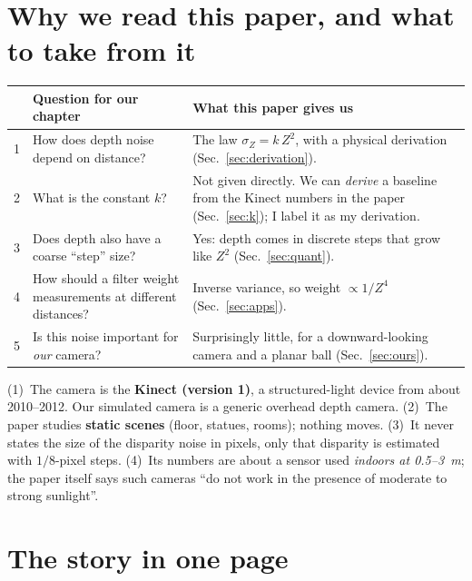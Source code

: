 \documentclass[11pt,a4paper]{article}
\begin{document}
\tableofcontents
\newpage

\section{Why we read this paper, and what to take from it}

\begin{center}
\begin{tabularx}{\textwidth}{@{}c p{4.6cm} X@{}}
\toprule
 & Question for our chapter & What this paper gives us \\
\midrule
1 & How does depth noise depend on distance? & The law $\sigma_Z = k\,Z^2$, with a physical derivation (Sec.~\ref{sec:derivation}). \\
2 & What is the constant $k$? & Not given directly. We can \emph{derive} a baseline from the Kinect numbers in the paper (Sec.~\ref{sec:k}); I label it as my derivation. \\
3 & Does depth also have a coarse ``step'' size? & Yes: depth comes in discrete steps that grow like $Z^2$ (Sec.~\ref{sec:quant}). \\
4 & How should a filter weight measurements at different distances? & Inverse variance, so weight $\propto 1/Z^4$ (Sec.~\ref{sec:apps}). \\
5 & Is this noise important for \emph{our} camera? & Surprisingly little, for a downward-looking camera and a planar ball (Sec.~\ref{sec:ours}). \\
\bottomrule
\end{tabularx}
\end{center}

\begin{warn}
(1)~The camera is the \textbf{Kinect (version 1)}, a structured-light device from about 2010--2012.
Our simulated camera is a generic overhead depth camera. (2)~The paper studies \textbf{static
scenes} (floor, statues, rooms); nothing moves. (3)~It never states the size of the disparity noise
in pixels, only that disparity is estimated with $1/8$-pixel steps. (4)~Its numbers are about a
sensor used \emph{indoors at 0.5--3~m}; the paper itself says such cameras ``do not work in the
presence of moderate to strong sunlight''.
\end{warn}

\section{The story in one page}
\end{document}
